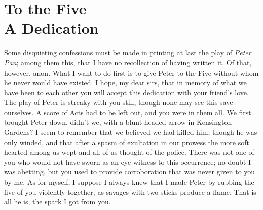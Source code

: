 
\section[To the Five: A Dedication]{To the Five\\A Dedication}

Some disquieting confessions must be made in printing at last the play of \emph{Peter Pan};
among them this, that I have no recollection of having written it.
Of that, however, anon.
What I want to do first is to give Peter to the Five without whom he never would have existed.
I hope, my dear sirs,
that in memory of what we have been to each other
you will accept this dedication with your friend’s love.
The play of Peter is streaky with you still,
though none may see this save ourselves.
A score of Acts had to be left out, and you were in them all.
We first brought Peter down, didn’t we, with a blunt‐headed arrow in Kensington Gardens?
I seem to remember that we believed we had killed him,
though he was only winded,
and that after a spasm of exultation in our prowess
the more soft hearted among us wept and all of us thought of the police.
There was not one of you who would not have sworn as an eye‐witness to this occurrence;
no doubt I was abetting,
but you used to provide corroboration that was never given to you by me.
As for myself,
I suppose I always knew that I made Peter by rubbing the five of you violently together,
as savages with two sticks produce a flame.
That is all he is, the spark I got from you.

